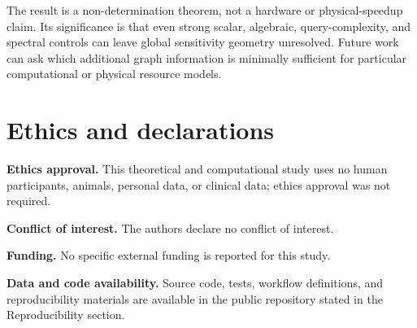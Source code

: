 \documentclass[twoside,12pt,letterpaper]{article}
\theoremstyle{definition}
\begin{document}
The result is a non-determination theorem, not a hardware or physical-speedup claim. Its significance is that even strong scalar, algebraic, query-complexity, and spectral controls can leave global sensitivity geometry unresolved. Future work can ask which additional graph information is minimally sufficient for particular computational or physical resource models.

\section*{Ethics and declarations}
\textbf{Ethics approval.} This theoretical and computational study uses no human participants, animals, personal data, or clinical data; ethics approval was not required.

\textbf{Conflict of interest.} The authors declare no conflict of interest.

\textbf{Funding.} No specific external funding is reported for this study.

\textbf{Data and code availability.} Source code, tests, workflow definitions, and reproducibility materials are available in the public repository stated in the Reproducibility section.



\printbibliography[heading=bibintoc]
\end{document}
